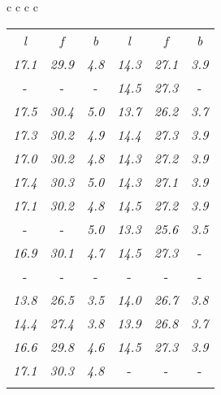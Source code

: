 \documentclass[sigplan,screen]{acmart}
\makeatletter
\newcommand{\ccell}[3][]{%
  \kern-\fboxsep
  \if\relax\detokenize{#1}\relax
    \expandafter\@firstoftwo
  \else
    \expandafter\@secondoftwo
  \fi
  {\colorbox{#2}}%
  {\colorbox[#1]{#2}}%
  {#3}\kern-\fboxsep
}
\makeatother
\begin{document}
\begin{table*}
\begin{tabular}{c c c c}
\begin{tabular}{c c c c c c}
   \hline
  \textit{l} & \textit{f} & \textit{b} & \textit{l} & \textit{f} & \textit{b} \\
      \textit{17.1} & \textit{29.9} & \textit{4.8} & \textit{14.3} & \textit{27.1} & \textit{3.9} \\
       \ccell[gray]{0.9}{\textit{17.6}} &  \ccell[gray]{0.9}{\textit{30.5}} &  \ccell[gray]{0.9}{\textit{5.1}} & \textit{14.5} & \textit{27.3} &  \ccell[gray]{0.9}{\textit{4.0}} \\
      \textit{17.5} & \textit{30.4} & \textit{5.0} & \textit{13.7} & \textit{26.2} & \textit{3.7} \\
      \textit{17.3} & \textit{30.2} & \textit{4.9} & \textit{14.4} & \textit{27.3} & \textit{3.9} \\
      \textit{17.0} & \textit{30.2} & \textit{4.8} & \textit{14.3} & \textit{27.2} & \textit{3.9} \\
      \textit{17.4} & \textit{30.3} & \textit{5.0} & \textit{14.3} & \textit{27.1} & \textit{3.9} \\
      \textit{17.1} & \textit{30.2} & \textit{4.8} & \textit{14.5} & \textit{27.2} & \textit{3.9} \\
       \ccell[gray]{0.9}{\textit{17.6}} &  \ccell[gray]{0.9}{\textit{30.5}} & \textit{5.0} & \textit{13.3} & \textit{25.6} & \textit{3.5} \\
      \textit{16.9} & \textit{30.1} & \textit{4.7} & \textit{14.5} & \textit{27.3} &  \ccell[gray]{0.9}{\textit{4.0}} \\
       \ccell[gray]{0.9}{\textit{17.6}} &  \ccell[gray]{0.9}{\textit{30.5}} &  \ccell[gray]{0.9}{\textit{5.1}} &  \ccell[gray]{0.9}{\textit{14.6}} &  \ccell[gray]{0.9}{\textit{27.4}} &  \ccell[gray]{0.9}{\textit{4.0}} \\
      \textit{13.8} & \textit{26.5} & \textit{3.5} & \textit{14.0} & \textit{26.7} & \textit{3.8} \\
      \textit{14.4} & \textit{27.4} & \textit{3.8} & \textit{13.9} & \textit{26.8} & \textit{3.7} \\
      \textit{16.6} & \textit{29.8} & \textit{4.6} & \textit{14.5} & \textit{27.3} & \textit{3.9} \\
      \textit{17.1} & \textit{30.3} & \textit{4.8} &  \ccell[gray]{0.9}{\textit{14.6}} &  \ccell[gray]{0.9}{\textit{27.4}} &  \ccell[gray]{0.9}{\textit{4.0}} \\
      
      
      \rule{0pt}{4ex}    
      

\end{tabular}
\end{tabular}
\end{table*}
\end{document}
